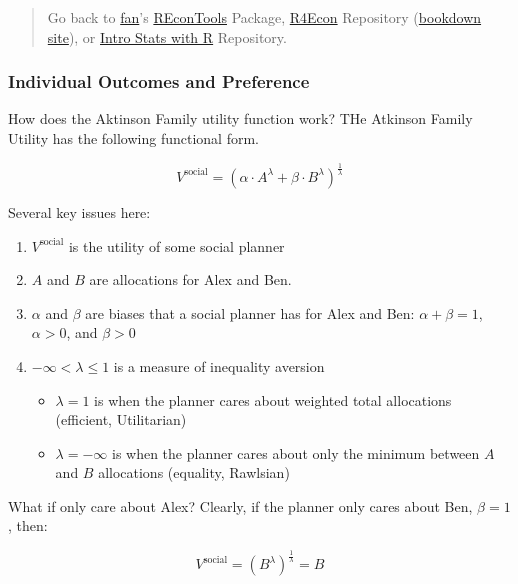 \documentclass[
]{book}
\providecommand{\tightlist}{%
  \setlength{\itemsep}{0pt}\setlength{\parskip}{0pt}}
\begin{document}
\begin{quote}
Go back to \href{http://fanwangecon.github.io/}{fan}'s \href{https://fanwangecon.github.io/REconTools/}{REconTools} Package, \href{https://fanwangecon.github.io/R4Econ/}{R4Econ} Repository (\href{https://fanwangecon.github.io/R4Econ/bookdown}{bookdown site}), or \href{https://fanwangecon.github.io/Stat4Econ/}{Intro Stats with R} Repository.
\end{quote}

\hypertarget{individual-outcomes-and-preference}{%
\subsubsection{Individual Outcomes and Preference}\label{individual-outcomes-and-preference}}

How does the Aktinson Family utility function work? THe Atkinson Family Utility has the following functional form.

\[
V^{\text{social}}
=
\left(
\alpha
\cdot
A^{\lambda}
+
\beta
\cdot
B^{\lambda}
\right)^{\frac{1}{\lambda}}
\]

Several key issues here:

\begin{enumerate}
\def\labelenumi{\arabic{enumi}.}
\tightlist
\item
  \(V^{\text{social}}\) is the utility of some social planner
\item
  \(A\) and \(B\) are allocations for Alex and Ben.
\item
  \(\alpha\) and \(\beta\) are biases that a social planner has for Alex and Ben: \(\alpha+\beta=1\), \(\alpha>0\), and \(\beta>0\)
\item
  \(-\infty < \lambda \le 1\) is a measure of inequality aversion

  \begin{itemize}
  \tightlist
  \item
    \(\lambda=1\) is when the planner cares about weighted total allocations (efficient, Utilitarian)
  \item
    \(\lambda=-\infty\) is when the planner cares about only the minimum between \(A\) and \(B\) allocations (equality, Rawlsian)
  \end{itemize}
\end{enumerate}

What if only care about Alex? Clearly, if the planner only cares about Ben, \(\beta=1\), then:

\[
V^{\text{social}}
=
\left(
B^{\lambda}
\right)^{\frac{1}{\lambda}}
= B
\]
\end{document}
